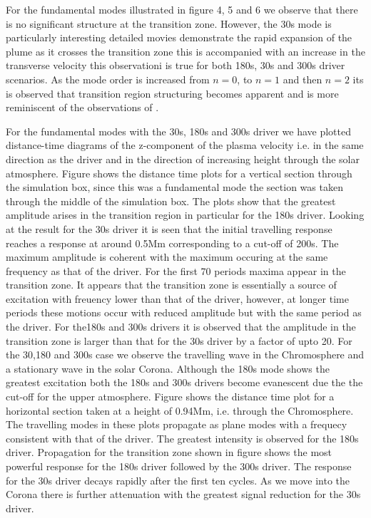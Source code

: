 \documentclass[final,1p]{elsarticle}
\begin{document}
For the fundamental modes  illustrated in figure 4, 5 and 6 we observe that there is no significant structure at the transition zone. However, the 30s mode is particularly interesting detailed movies demonstrate the rapid expansion of the plume as it crosses the transition zone this is accompanied with an increase in the transverse velocity this observationi is true for both 180s, 30s and 300s driver scenarios. As the mode order is increased from $n=0$, to $n=1$ and then $n=2$ its is observed that transition region structuring becomes apparent and is more reminiscent of the observations of \cite{Malins2007B}.

For the fundamental modes with the 30s, 180s and 300s driver we have plotted distance-time diagrams of the z-component of the plasma velocity i.e. in the same direction as the driver and in the direction of increasing height through the solar atmosphere.  Figure
 shows the distance time plots for a vertical section through the simulation box, since this was a fundamental mode the section was taken through the middle of the simulation box. The plots show that the greatest amplitude arises in the transition region in particular for the 180s driver. Looking at the result for the 30s driver it is seen that the initial travelling response reaches a response at around 0.5Mm corresponding to a cut-off of 200s. The maximum amplitude is coherent with the maximum occuring at the same frequency as that of the driver. For the first 70 periods maxima appear in the transition zone. It appears that the transition zone is essentially a source of excitation with freuency lower than that of the driver, however, at longer time periods these motions occur with reduced amplitude but with the same period as the driver. For the180s and 300s drivers it is observed that the amplitude in the transition zone is larger than that for the 30s driver by a factor of upto 20. For the 30,180 and 300s case we observe the travelling wave in the Chromosphere and a stationary wave in the solar Corona. Although the 180s mode shows the greatest excitation both the 180s and 300s drivers become evanescent due the the cut-off for the upper atmosphere. Figure  shows the distance time plot for a horizontal section taken at a height of 0.94Mm, i.e. through the Chromosphere. The travelling modes in these plots propagate as plane modes with a frequecy consistent with that of the driver. The greatest intensity is observed for the 180s driver. Propagation for the transition zone shown in figure  shows the most powerful response for the 180s driver followed by the 300s driver. The response for the 30s driver decays rapidly after the first ten cycles. As we move into the Corona there is further attenuation with the greatest signal reduction for the 30s driver.
\end{document}
